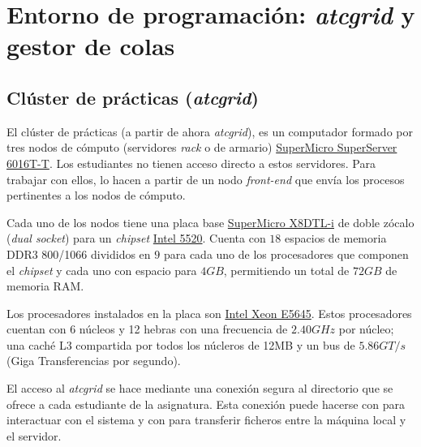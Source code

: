 \chapter{Entorno de programación: \textit{atcgrid} y gestor de colas}

\section{Clúster de prácticas (\textit{atcgrid})}

El clúster de prácticas (a partir de ahora \textit{atcgrid}), es un computador formado por tres nodos de cómputo (servidores \textit{rack} o de armario) \href{https://www.supermicro.com/products/system/1U/6016/SYS-6016T-T.cfm}{SuperMicro SuperServer 6016T-T}.
Los estudiantes no tienen acceso directo a estos servidores.
Para trabajar con ellos, lo hacen a partir de un nodo \textit{front-end} que envía los procesos pertinentes a los nodos de cómputo.

Cada uno de los nodos tiene una placa base \href{www.supermicro.com/products/motherboard/QPI/5500/X8DTL-i.cfm}{SuperMicro X8DTL-i} de doble zócalo (\textit{dual socket}) para un \textit{chipset} \href{https://www.intel.com/content/www/us/en/design/products-and-solutions/processors-and-chipsets/tylersburg/technical-library.html}{Intel 5520}.
Cuenta con $18$ espacios de memoria DDR3 800/1066 divididos en $9$ para cada uno de los procesadores que componen el \textit{chipset} y cada uno con espacio para $4GB$, permitiendo un total de $72GB$ de memoria RAM\@.

Los procesadores instalados en la placa son \href{https://ark.intel.com/content/www/us/en/ark/products/48768/intel-xeon-processor-e5645-12m-cache-2-40-ghz-5-86-gt-s-intel-qpi.html}{Intel Xeon E5645}.
Estos procesadores cuentan con 6 núcleos y 12 hebras con una frecuencia de $2.40GHz$ por núcleo; una caché L3 compartida por todos los núcleros de 12MB y un bus de $5.86GT/s$ (Giga Transferencias por segundo).

El acceso al \textit{atcgrid} se hace mediante una conexión segura al directorio  que se ofrece a cada estudiante de la asignatura.
Esta conexión puede hacerse con  para interactuar con el sistema y con  para transferir ficheros entre la máquina local y el servidor.

\subsection{}

